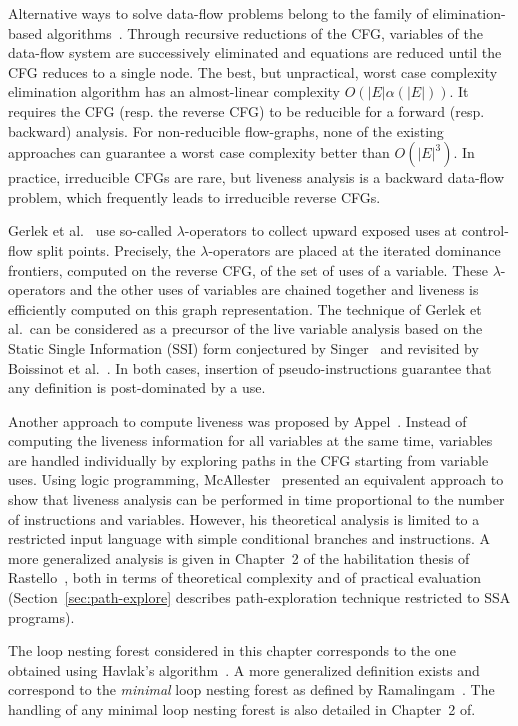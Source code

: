 Alternative ways to solve data-flow problems belong to the family of elimina\-tion-based algorithms~\cite{RyPa86b}. Through recursive reductions of the 
CFG, variables of the data-flow system are successively eliminated and equations are reduced until the CFG reduces to a single node. 
The best, but unpractical, worst case complexity elimination algorithm has an almost-linear complexity $O(|E|\alpha(|E|))$. 
It requires the CFG (resp. the reverse CFG) to be reducible for a forward (resp.  backward) analysis.
For non-reducible flow-graphs, none of the existing approa\-ches can guarantee a worst case complexity better than $O(|E|^3)$.
In practice, irreducible CFGs are rare, but liveness
analysis is a backward data-flow problem, which frequently leads to
irreducible reverse CFGs. 

Gerlek et al.~\cite{gerlek94reference} use so-called $\lambda$-operators to collect upward exposed uses at control-flow split points.
Precisely, the $\lambda$-operators are placed at the iterated dominance frontiers, computed on the reverse CFG, of the set of uses of a variable.
These $\lambda$-operators and the other uses of variables are chained together and liveness is efficiently computed on this graph representation.
The technique of Gerlek et al.~can be considered as a precursor of the live variable analysis based on the Static Single Information (SSI) form conjectured by Singer~\cite{novillo:bib:S05} and revisited by Boissinot et al.~\cite{BoissinotBDR12}.
In both cases, insertion of pseudo-instructions guarantee that any definition is post-dominated by a use.

Another approach to compute liveness was proposed by
Appel~\cite[p.~429]{appel:2002:modern}. Instead of computing the liveness
information for all variables at the same time, variables are handled
individually by exploring paths in the CFG starting from variable uses. 
Using logic programming, McAllester~\cite{M02} presented an equivalent approach to show that liveness analysis can be performed in time
proportional to the number of instructions and variables.
However, his theoretical analysis is limited to a restricted input language
with simple conditional branches and instructions.
A more generalized analysis is given in Chapter~2 of the habilitation thesis of Rastello~\cite{rastello-hab}, both in terms of theoretical complexity and of practical evaluation (Section~\ref{sec:path-explore} describes path-exploration technique restricted to SSA programs).

The loop nesting forest considered in this chapter corresponds to the one obtained using Havlak's algorithm~\cite{Havlak:1997:TOPLAS}.
A more generalized definition exists and correspond to the \emph{minimal} loop nesting forest as defined by Ramalingam~\cite{Ramalingam:2002:TOPLAS}.
The handling of any minimal loop nesting forest is also detailed in Chapter~2 of\cite{rastello-hab}.

